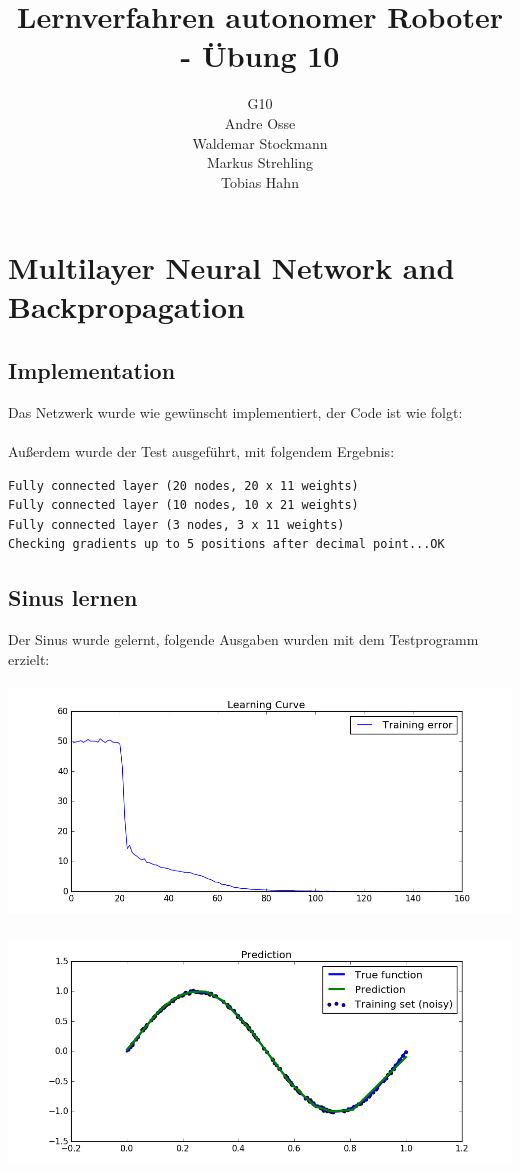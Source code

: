 \documentclass{article}
\title{Lernverfahren autonomer Roboter - Übung 10}
\author{G10\\ Andre Osse\\ Waldemar Stockmann\\ Markus Strehling\\ Tobias Hahn}
\begin{document}
\maketitle
\newpage
\section{Multilayer Neural Network and Backpropagation}

\subsection{Implementation}
Das Netzwerk wurde wie gewünscht implementiert, der Code ist wie folgt:



\paragraph{}
Außerdem wurde der Test ausgeführt, mit folgendem Ergebnis:
\begin{lstlisting}
Fully connected layer (20 nodes, 20 x 11 weights)
Fully connected layer (10 nodes, 10 x 21 weights)
Fully connected layer (3 nodes, 3 x 11 weights)
Checking gradients up to 5 positions after decimal point...OK
\end{lstlisting}

\subsection{Sinus lernen}
Der Sinus wurde gelernt, folgende Ausgaben wurden mit dem Testprogramm erzielt:
\paragraph{}
\includegraphics[width=\textwidth]{learning_rate.png}
\paragraph{}
\includegraphics[width=\textwidth]{prediction.png}
\end{document}
